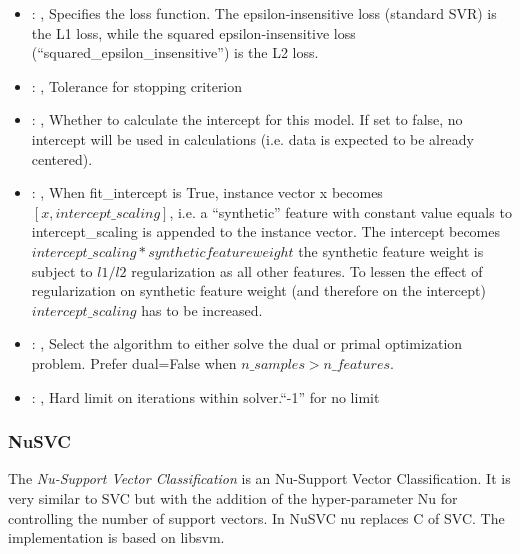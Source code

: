 \begin{itemize}
    \item {}: , 
      Specifies the loss function. The epsilon-insensitive loss (standard SVR)
      is the L1 loss, while the squared epsilon-insensitive loss (``squared\_epsilon\_insensitive'')
      is the L2 loss.

    \item {}: , 
      Tolerance for stopping criterion

    \item {}: , 
      Whether to calculate the intercept for this model. If set to false, no
      intercept will be used in calculations (i.e. data is expected to be already centered).

    \item {}: , 
      When fit\_intercept is True, instance vector x becomes $[x, intercept\_scaling]$,
      i.e. a “synthetic” feature with constant value equals to intercept\_scaling is appended
      to the instance vector. The intercept becomes $intercept\_scaling * synthetic feature weight$
      \nb the synthetic feature weight is subject to $l1/l2$ regularization as all other features.
      To lessen the effect of regularization on synthetic feature weight (and therefore on the
      intercept)                                                  $intercept\_scaling$ has to be
      increased.

    \item {}: , 
      Select the algorithm to either solve the dual or primal optimization problem.
      Prefer dual=False when $n\_samples > n\_features$.

    \item {}: , 
      Hard limit on iterations within solver.``-1'' for no limit
  \end{itemize}


\subsubsection{NuSVC}
  The  \textit{Nu-Support Vector Classification} is an Nu-Support Vector
  Classification.                             It is very similar to SVC but with the addition of the
  hyper-parameter Nu for controlling the                             number of support vectors. In
  NuSVC nu replaces C of SVC.                             The implementation is based on libsvm.

